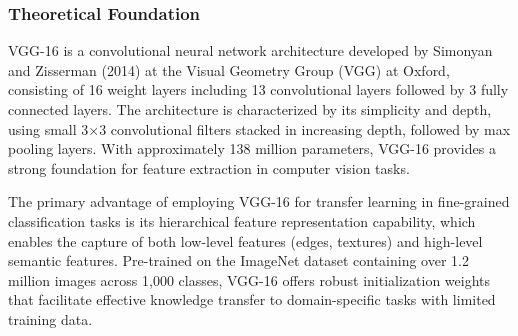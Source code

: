 \documentclass[a4paper,12pt]{report}
\begin{document}


    

\subsubsection{Theoretical Foundation}

VGG-16 is a convolutional neural network architecture developed by Simonyan and Zisserman (2014) at the Visual Geometry Group (VGG) at Oxford, consisting of 16 weight layers including 13 convolutional layers followed by 3 fully connected layers. The architecture is characterized by its simplicity and depth, using small 3×3 convolutional filters stacked in increasing depth, followed by max pooling layers. With approximately 138 million parameters, VGG-16 provides a strong foundation for feature extraction in computer vision tasks.

The primary advantage of employing VGG-16 for transfer learning in fine-grained classification tasks is its hierarchical feature representation capability, which enables the capture of both low-level features (edges, textures) and high-level semantic features. Pre-trained on the ImageNet dataset containing over 1.2 million images across 1,000 classes, VGG-16 offers robust initialization weights that facilitate effective knowledge transfer to domain-specific tasks with limited training data.
\end{document}
